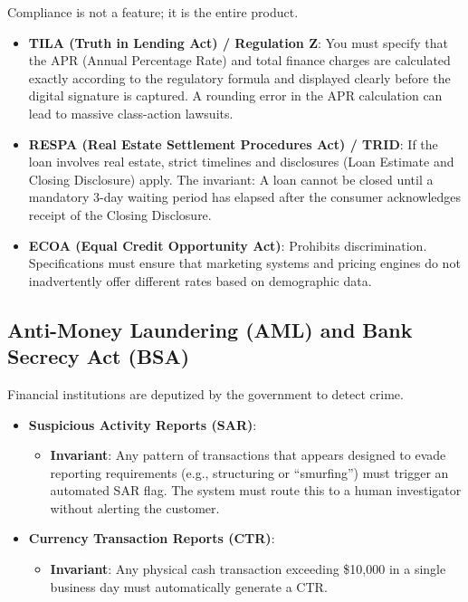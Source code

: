 \documentclass[
  11pt,
  openany,
  oneside]{book}
\providecommand{\tightlist}{%
  \setlength{\itemsep}{0pt}\setlength{\parskip}{0pt}}
\begin{document}
Compliance is not a feature; it is the entire product.

\begin{itemize}
\tightlist
\item
  \textbf{TILA (Truth in Lending Act) / Regulation Z}: You must specify
  that the APR (Annual Percentage Rate) and total finance charges are
  calculated exactly according to the regulatory formula and displayed
  clearly before the digital signature is captured. A rounding error in
  the APR calculation can lead to massive class-action lawsuits.
\item
  \textbf{RESPA (Real Estate Settlement Procedures Act) / TRID}: If the
  loan involves real estate, strict timelines and disclosures (Loan
  Estimate and Closing Disclosure) apply. The invariant: A loan cannot
  be closed until a mandatory 3-day waiting period has elapsed after the
  consumer acknowledges receipt of the Closing Disclosure.
\item
  \textbf{ECOA (Equal Credit Opportunity Act)}: Prohibits
  discrimination. Specifications must ensure that marketing systems and
  pricing engines do not inadvertently offer different rates based on
  demographic data.
\end{itemize}

\subsection{Anti-Money Laundering (AML) and Bank Secrecy Act
(BSA)}\label{anti-money-laundering-aml-and-bank-secrecy-act-bsa}

Financial institutions are deputized by the government to detect crime.

\begin{itemize}
\tightlist
\item
  \textbf{Suspicious Activity Reports (SAR)}:

  \begin{itemize}
  \tightlist
  \item
    \textbf{Invariant}: Any pattern of transactions that appears
    designed to evade reporting requirements (e.g., structuring or
    ``smurfing'') must trigger an automated SAR flag. The system must
    route this to a human investigator without alerting the customer.
  \end{itemize}
\item
  \textbf{Currency Transaction Reports (CTR)}:

  \begin{itemize}
  \tightlist
  \item
    \textbf{Invariant}: Any physical cash transaction exceeding \$10,000
    in a single business day must automatically generate a CTR.
  \end{itemize}
\end{itemize}
\end{document}
